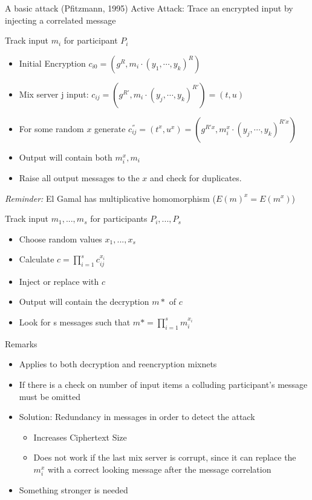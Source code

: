 \documentclass{beamer}
\begin{document}
\begin{frame}[allowframebreaks]{A basic attack (Pfitzmann, 1995)}
Active Attack: Trace an encrypted input by injecting a correlated message
\begin{block}{Track input $m_i$ for participant $P_i$}
\begin{itemize}
\item Initial Encryption $c_{i0} = (g^R, m_i \cdot (y_1,\cdots,y_k)^R)$
\item Mix server j input: $c_{ij} = (g^{R'}, m_i \cdot (y_j,\cdots,y_k)^{R'}) = (t,u)$
\item For some random $x$ generate $c^{''}_{ij} = (t^x,u^x)=(g^{R'x}, m_{i}^{x} \cdot (y_j,\cdots,y_k)^{R'x})$
\item Output will contain both $m_{i}^{x},m_{i}$
\item Raise all output messages to the $x$ and check for duplicates.
\end{itemize}
\textit{Reminder: } El Gamal has multiplicative homomorphism ($E(m)^x = E(m^x)$)
\end{block}

\begin{block}{Track input $m_1, ..., m_s$ for participants $P_i, ..., P_s$}
\begin{itemize}
\item Choose random values $x_1, ..., x_s$
\item Calculate $c = \prod_{i=1}^{s} c_{ij}^{x_i}$
\item Inject or replace with $c$
\item Output will contain the decryption $m*$ of $c$ 
\item Look for s messages such that $m* =  \prod_{i=1}^{s} m_i^{x_i}$
\end{itemize}
\end{block}

\begin{block}{Remarks}
\begin{itemize}
\item Applies to both decryption and reencryption mixnets
\item If there is a check on number of input items a colluding participant's message must be omitted
\item Solution: Redundancy in messages in order to detect the attack
\begin{itemize}
\item Increases Ciphertext Size
\item Does not work if the last mix server is corrupt, since it can replace the $m_{i}^{x}$ with a correct looking message after the message correlation
\end{itemize} 
\item Something stronger is needed
\end{itemize}
\end{block}
\end{frame}
\end{document}
